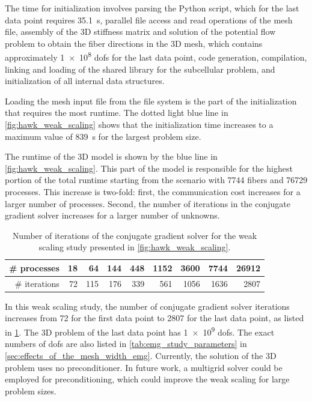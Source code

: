 The time for initialization involves parsing the Python script, which for the last data point requires \SI{35.1}{\s}, parallel file access and read operations of the mesh file, assembly of the 3D stiffness matrix and solution of the potential flow problem to obtain the fiber directions in the 3D mesh, which contains approximately \num{1e8} dofs for the last data point, code generation, compilation, linking and loading of the shared library for the subcellular problem, and initialization of all internal data structures.

Loading the mesh input file from the file system is the part of the initialization that requires the most runtime.
The dotted light blue line in \cref{fig:hawk_weak_scaling} shows that the initialization time increases to a maximum value of \SI{839}{\s} for the largest problem size.

The runtime of the 3D model is shown by the blue line in \cref{fig:hawk_weak_scaling}. This part of the model is responsible for the highest portion of the total runtime starting from the scenario with \num{7744} fibers and \num{76729} processes. This increase is two-fold: first, the communication cost increases for a larger number of processes. Second, the number of iterations in the conjugate gradient solver increases for a larger number of unknowns.

\begin{table}
  \centering%
  \begin{tabular}{|r|r|r|r|r|r|r|r|r|}
    \hline
    \# processes  & 18 & 64  & 144 & 448  & 1152 & 3600 & 7744 & \num{26912}\\\hline
    \# iterations & 72 & 115 & 176 & 339  & 561  & 1056 & 1636 & 2807\\
    \hline
  \end{tabular}
  \caption{Number of iterations of the conjugate gradient solver for the weak scaling study presented in \cref{fig:hawk_weak_scaling}.}%
  \label{tab:cg_solver_iterations}%
\end{table}

In this weak scaling study, the number of conjugate gradient solver iterations increases from 72 for the first data point to \num{2807} for the last data point, as listed in \cref{tab:cg_solver_iterations}. The 3D problem of the last data point has \num{1e9} dofs. The exact numbers of dofs are also listed in \cref{tab:emg_study_parameters} in \cref{sec:effects_of_the_mesh_width_emg}.
Currently, the solution of the 3D problem uses no preconditioner. In future work, a multigrid solver could be employed for preconditioning, which could improve the weak scaling for large problem sizes.

